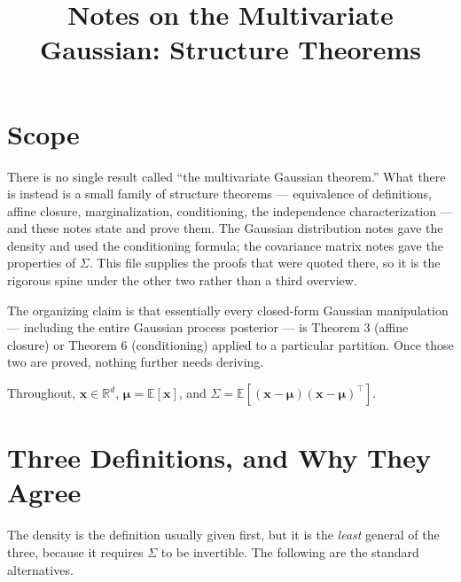 \documentclass[conference]{IEEEtran}
\title{Notes on the Multivariate Gaussian: Structure Theorems}
\author{
\IEEEauthorblockN{Luis Mendez}
}
\begin{document}
\maketitle

\section*{Scope}
There is no single result called ``the multivariate Gaussian theorem.'' What there is instead is a small family of structure theorems --- equivalence of definitions, affine closure, marginalization, conditioning, the independence characterization --- and these notes state and prove them. The Gaussian distribution notes gave the density and used the conditioning formula; the covariance matrix notes gave the properties of $\Sigma$. This file supplies the proofs that were quoted there, so it is the rigorous spine under the other two rather than a third overview.

The organizing claim is that essentially every closed-form Gaussian manipulation --- including the entire Gaussian process posterior --- is Theorem 3 (affine closure) or Theorem 6 (conditioning) applied to a particular partition. Once those two are proved, nothing further needs deriving.

Throughout, $\mathbf{x} \in \mathbb{R}^d$, $\boldsymbol{\mu} = \mathbb{E}[\mathbf{x}]$, and $\Sigma = \mathbb{E}[(\mathbf{x}-\boldsymbol{\mu})(\mathbf{x}-\boldsymbol{\mu})^{\!\top}]$.

\section*{Three Definitions, and Why They Agree}
The density is the definition usually given first, but it is the \textit{least} general of the three, because it requires $\Sigma$ to be invertible. The following are the standard alternatives.
\end{document}
